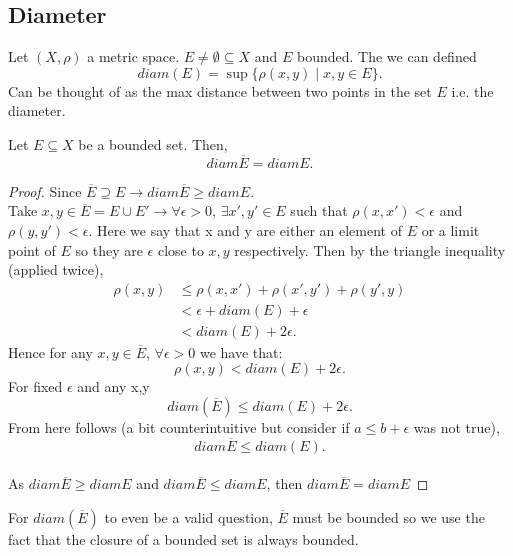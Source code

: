 \documentclass[a4paper]{article}
\begin{document}
\subsection{Diameter}

\begin{definition}
 Let $(X, \rho)$ a metric space.  $E \neq \emptyset \subseteq X$ and  $E$ bounded. The we can defined
 \[
diam(E) = \sup \{\rho(x,y) \mid x,y \in E \} 
.\] 
Can be thought of as the max distance between two points in the set $E$ i.e. the diameter. 
\end{definition}
\begin{lemma}
Let $E \subseteq X$ be a bounded set. Then, 
\[
diam \overline{E} = diam E
.\] 

\begin{proof}
  Since $\overline{E} \supseteq E \to diam \overline{E} \geq diam E$. \\


  Take $x,y \in \overline{E} = E \cup E' \to \forall \epsilon > 0$, $\exists x',y' \in E$ such that $\rho(x,x') < \epsilon$ and $\rho(y,y') < \epsilon$. Here we say that x and y are either an element of $E$ or a limit point of  $E$ so they are  $\epsilon$ close to $x,y$ respectively. Then by the triangle inequality (applied twice), 
 \begin{align*}
   \rho(x,y) &\leq  \rho(x,x') + \rho(x',y') + \rho(y',y) \\
             &< \epsilon + diam(E) + \epsilon \\
             &< diam(E) + 2\epsilon
 .\end{align*}
 Hence for any $x,y \in \overline{E}$, $\forall \epsilon > 0$ we have that:
  \[
 \rho(x,y) < diam(E) + 2 \epsilon
 .\]
 For fixed $\epsilon$ and any x,y
 \[
 diam(\overline{E}) \leq diam(E) + 2 \epsilon
 .\] 
 From here follows (a bit counterintuitive but consider if $a \leq b + \epsilon$ was not true),
 \[
 diam \overline{E} \leq diam(E)
 .\] \\

 As $diam \overline{E} \geq diam E$ and $diam \overline{E} \leq diam E$, then $diam \overline{E} = diam E$
\end{proof}
\end{lemma}
\begin{note}
  For $diam(\overline{E})$ to even be a valid question, $\overline{E}$ must be bounded so we use the fact that the closure of a bounded set is always bounded.
\end{note}
\end{document}

